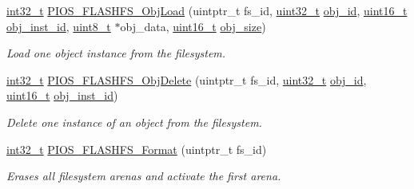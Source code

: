\begin{DoxyCompactItemize}
\hyperlink{group___n_a_m_e_gafd12020da5a235dfcf0c3c748fb5baed}{int32\-\_\-t} \hyperlink{group___p_i_o_s___f_l_a_s_h_f_s_ga159a3e2681cd03a6512dd59348c8a764}{P\-I\-O\-S\-\_\-\-F\-L\-A\-S\-H\-F\-S\-\_\-\-Obj\-Load} (uintptr\-\_\-t fs\-\_\-id, \hyperlink{stdint_8h_a435d1572bf3f880d55459d9805097f62}{uint32\-\_\-t} \hyperlink{posix_2posix_2pios__flashfs__logfs_8c_a4901f00431a2c948153bd4f187fce556}{obj\-\_\-id}, \hyperlink{stdint_8h_a273cf69d639a59973b6019625df33e30}{uint16\-\_\-t} \hyperlink{posix_2posix_2pios__flashfs__logfs_8c_a7930e82075aa4e3326ad9615090b5d61}{obj\-\_\-inst\-\_\-id}, \hyperlink{stdint_8h_aba7bc1797add20fe3efdf37ced1182c5}{uint8\-\_\-t} $\ast$obj\-\_\-data, \hyperlink{stdint_8h_a273cf69d639a59973b6019625df33e30}{uint16\-\_\-t} \hyperlink{posix_2posix_2pios__flashfs__logfs_8c_acd6c9a9729f524a58be43afcb2d0782a}{obj\-\_\-size})
\begin{DoxyCompactList}\small\item\em Load one object instance from the filesystem. \end{DoxyCompactList}\item 
\hyperlink{group___n_a_m_e_gafd12020da5a235dfcf0c3c748fb5baed}{int32\-\_\-t} \hyperlink{group___p_i_o_s___f_l_a_s_h_f_s_ga93a9e7b90c573b3784dd52781bf11e93}{P\-I\-O\-S\-\_\-\-F\-L\-A\-S\-H\-F\-S\-\_\-\-Obj\-Delete} (uintptr\-\_\-t fs\-\_\-id, \hyperlink{stdint_8h_a435d1572bf3f880d55459d9805097f62}{uint32\-\_\-t} \hyperlink{posix_2posix_2pios__flashfs__logfs_8c_a4901f00431a2c948153bd4f187fce556}{obj\-\_\-id}, \hyperlink{stdint_8h_a273cf69d639a59973b6019625df33e30}{uint16\-\_\-t} \hyperlink{posix_2posix_2pios__flashfs__logfs_8c_a7930e82075aa4e3326ad9615090b5d61}{obj\-\_\-inst\-\_\-id})
\begin{DoxyCompactList}\small\item\em Delete one instance of an object from the filesystem. \end{DoxyCompactList}\item 
\hyperlink{group___n_a_m_e_gafd12020da5a235dfcf0c3c748fb5baed}{int32\-\_\-t} \hyperlink{group___p_i_o_s___f_l_a_s_h_f_s_ga9dccc10d534e33e6b52df18f60d27a58}{P\-I\-O\-S\-\_\-\-F\-L\-A\-S\-H\-F\-S\-\_\-\-Format} (uintptr\-\_\-t fs\-\_\-id)
\begin{DoxyCompactList}\small\item\em Erases all filesystem arenas and activate the first arena. \end{DoxyCompactList}\end{DoxyCompactItemize}
